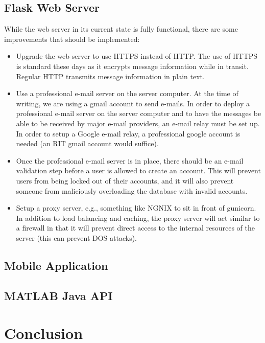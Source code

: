 \documentclass[conference]{IEEEtran}
\begin{document}
\subsection{Flask Web Server}

While the web server in its current state is fully functional, there are some improvements that should be implemented:

\begin{itemize}
    \item Upgrade the web server to use HTTPS instead of HTTP. The use of HTTPS is standard these days as it encrypts message information while in transit. Regular HTTP transmits message information in plain text.
    \item Use a professional e-mail server on the server computer. At the time of writing, we are using a gmail account to send e-mails. In order to deploy a professional e-mail server on the server computer and to have the messages be able to be received by major e-mail providers, an e-mail relay must be set up. In order to setup a Google e-mail relay, a professional google account is needed (an RIT gmail account would suffice).
    \item Once the professional e-mail server is in place, there should be an e-mail validation step before a user is allowed to create an account. This will prevent users from being locked out of their accounts, and it will also prevent someone from maliciously overloading the database with invalid accounts.
    \item Setup a proxy server, e.g., something like NGNIX to sit in front of gunicorn. In addition to load balancing and caching, the proxy server will act similar to a firewall in that it will prevent direct access to the internal resources of the server (this can prevent DOS attacks).
\end{itemize}

\subsection{Mobile Application}

\subsection{MATLAB Java API}

\section{Conclusion}
\end{document}

